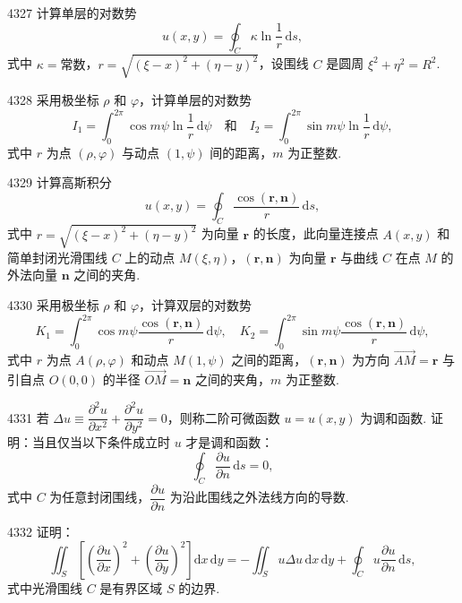 \begin{prob}[M]{4327}
计算单层的对数势
\[
u(x,y) = \oint_C \kappa \ln \frac{1}{r}\,\mathrm{d}s,
\]
式中 $\kappa = \text{常数}$，$r = \sqrt{(\xi - x)^2 + (\eta - y)^2}$，设围线 $C$ 是圆周 $\xi^2 + \eta^2 = R^2$.
\end{prob}

\begin{prob}[M]{4328}
采用极坐标 $\rho$ 和 $\varphi$，计算单层的对数势
\[
I_1 = \int_0^{2\pi} \cos m\psi \ln \frac{1}{r}\,\mathrm{d}\psi \quad \text{和} \quad I_2 = \int_0^{2\pi} \sin m\psi \ln \frac{1}{r}\,\mathrm{d}\psi,
\]
式中 $r$ 为点 $(\rho, \varphi)$ 与动点 $(1, \psi)$ 间的距离，$m$ 为正整数.
\end{prob}

\begin{prob}[M]{4329}
计算高斯积分
\[
u(x,y) = \oint_C \frac{\cos(\boldsymbol{r}, \boldsymbol{n})}{r}\,\mathrm{d}s,
\]
式中 $r = \sqrt{(\xi - x)^2 + (\eta - y)^2}$ 为向量 $\boldsymbol{r}$ 的长度，此向量连接点 $A(x,y)$ 和简单封闭光滑围线 $C$ 上的动点 $M(\xi, \eta)$，$(\boldsymbol{r}, \boldsymbol{n})$ 为向量 $\boldsymbol{r}$ 与曲线 $C$ 在点 $M$ 的外法向量 $\boldsymbol{n}$ 之间的夹角.
\end{prob}

\begin{prob}[M]{4330}
采用极坐标 $\rho$ 和 $\varphi$，计算双层的对数势
\[
K_1 = \int_0^{2\pi} \cos m\psi \frac{\cos(\boldsymbol{r}, \boldsymbol{n})}{r}\,\mathrm{d}\psi, \quad K_2 = \int_0^{2\pi} \sin m\psi \frac{\cos(\boldsymbol{r}, \boldsymbol{n})}{r}\,\mathrm{d}\psi,
\]
式中 $r$ 为点 $A(\rho, \varphi)$ 和动点 $M(1, \psi)$ 之间的距离，$(\boldsymbol{r}, \boldsymbol{n})$ 为方向 $\overrightarrow{AM} = \boldsymbol{r}$ 与引自点 $O(0,0)$ 的半径 $\overrightarrow{OM} = \boldsymbol{n}$ 之间的夹角，$m$ 为正整数.
\end{prob}

\begin{prob}[M]{4331}
若 $\Delta u \equiv \dfrac{\partial^2 u}{\partial x^2} + \dfrac{\partial^2 u}{\partial y^2} = 0$，则称二阶可微函数 $u = u(x,y)$ 为调和函数. 证明：当且仅当以下条件成立时 $u$ 才是调和函数：
\[
\oint_C \frac{\partial u}{\partial n}\,\mathrm{d}s = 0,
\]
式中 $C$ 为任意封闭围线，$\dfrac{\partial u}{\partial n}$ 为沿此围线之外法线方向的导数.
\end{prob}

\begin{prob}[M]{4332}
证明：
\[
\iint_S \left[ \left( \frac{\partial u}{\partial x} \right)^2 + \left( \frac{\partial u}{\partial y} \right)^2 \right] \mathrm{d}x\,\mathrm{d}y = -\iint_S u \Delta u\,\mathrm{d}x\,\mathrm{d}y + \oint_C u \frac{\partial u}{\partial n}\,\mathrm{d}s,
\]
式中光滑围线 $C$ 是有界区域 $S$ 的边界.
\end{prob}

